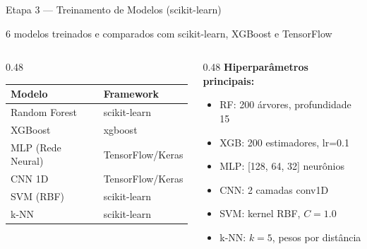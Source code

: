 \documentclass[aspectratio=169, 11pt]{beamer}
\begin{document}
\begin{frame}{Etapa 3 — Treinamento de Modelos (scikit-learn)}
  \begin{block}{6 modelos treinados e comparados com scikit-learn, XGBoost e TensorFlow}
  \end{block}
  \vspace{0.3cm}
  \begin{columns}[T]
    \begin{column}{0.48\textwidth}
      \begin{tabular}{ll}
        \toprule
        \textbf{Modelo} & \textbf{Framework} \\
        \midrule
        Random Forest & scikit-learn \\
        XGBoost       & xgboost \\
        MLP (Rede Neural) & TensorFlow/Keras \\
        CNN 1D        & TensorFlow/Keras \\
        SVM (RBF)     & scikit-learn \\
        k-NN          & scikit-learn \\
        \bottomrule
      \end{tabular}
    \end{column}
    \begin{column}{0.48\textwidth}
      \textbf{Hiperparâmetros principais:}
      \begin{itemize}
        \item RF: 200 árvores, profundidade 15
        \item XGB: 200 estimadores, lr=0.1
        \item MLP: [128, 64, 32] neurônios
        \item CNN: 2 camadas conv1D
        \item SVM: kernel RBF, $C=1.0$
        \item k-NN: $k=5$, pesos por distância
      \end{itemize}
    \end{column}
  \end{columns}
\end{frame}
\end{document}
